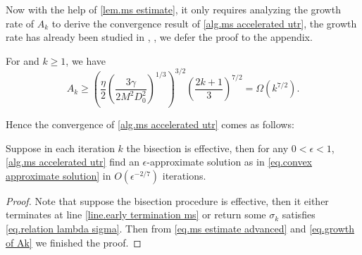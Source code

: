 \documentclass{article}
\begin{document}
Now with the help of \autoref{lem.ms estimate}, it only requires analyzing the growth rate of $A_k$ to derive the convergence result of \autoref{alg.ms accelerated utr}, the growth rate has already been studied in \citet[Lemma 4.2]{monteiro2013accelerated}, \citet[Lemma 4.3.5]{nesterov_lectures_2018}, we defer the proof to the appendix.
\begin{lemma}
    \label{lem.growth of Ak}
    For and $k\geq 1$, we have
    \begin{equation}
        \label{eq.growth of Ak}
        A_k \geq \left(\frac{\eta}{2}\left (\frac{3\gamma}{2M^2D_0^2}\right)^{1/3}\right)^{3 / 2}\left(\frac{2 k+1}{3}\right)^{7/2} = \Omega(k^{7/2}).
    \end{equation}
\end{lemma}
Hence the convergence of \autoref{alg.ms accelerated utr} comes as follows:
\begin{theorem}\label{thm.outer loop complexity}
    Suppose in each iteration $k$ the bisection is effective, then for any $0<\epsilon<1$, \autoref{alg.ms accelerated utr} find an $\epsilon$-approximate solution as in \eqref{eq.convex approximate solution} in $O(\epsilon^{-2/7})$ iterations.
\end{theorem}
\begin{proof}
    Note that suppose the bisection procedure is effective, then it either terminates at line \ref{line.early termination ms} or return some $\sigma_k$ satisfies \eqref{eq.relation lambda sigma}. Then from \eqref{eq.ms estimate advanced} and \eqref{eq.growth of Ak} we finished the proof.
\end{proof}
\end{document}
